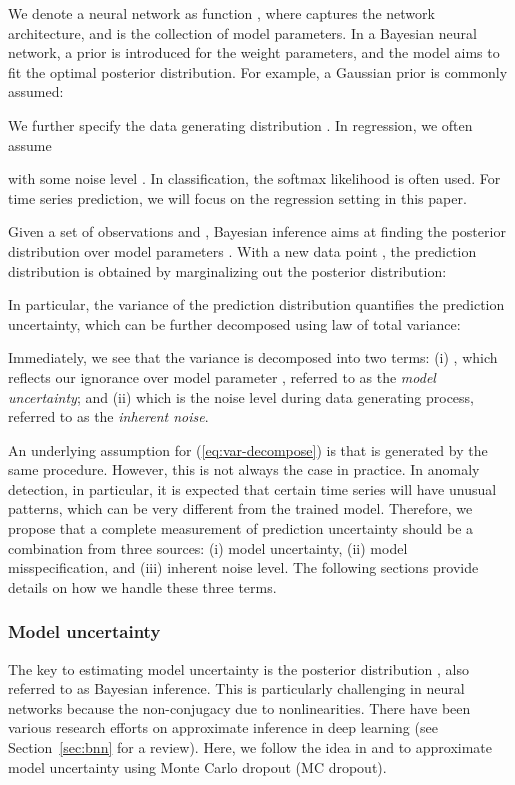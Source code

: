 \documentclass[conference,compsoc,final]{IEEEtran}
\begin{document}
We denote a neural network as function , where  captures the network architecture, and  is the collection of model parameters. 
In a Bayesian neural network, a prior is introduced for the weight parameters, and the model aims to fit the optimal posterior distribution. For example, a Gaussian prior is commonly assumed:

We further specify the data generating distribution . In regression, we often assume

with some noise level . In classification, the softmax likelihood is often used. For time series prediction, we will focus on the regression setting in this paper.

Given a set of  observations  and , Bayesian inference aims at finding the posterior distribution over model parameters . With a new data point , the prediction distribution is obtained by marginalizing out the posterior distribution:

In particular, the variance of the prediction distribution quantifies the prediction uncertainty, which can be further decomposed using law of total variance:


Immediately, we see that the variance is decomposed into two terms: (i) , which reflects our ignorance over model parameter , referred to as the {\it model uncertainty}; and (ii)  which is the noise level during data generating process,  referred to as the {\it inherent noise}.

An underlying assumption for (\ref{eq:var-decompose}) is that  is generated by the same procedure. However, this is not always the case in practice. In anomaly detection, in particular, it is expected that certain time series will have unusual patterns, which can be very different from the trained model. Therefore, we propose that a complete measurement of prediction uncertainty should be a combination from three sources: (i) model uncertainty, (ii) model misspecification, and (iii) inherent noise level. 
The following sections provide details on how we handle these three terms.

\subsubsection{Model uncertainty}
The key to estimating model uncertainty is the posterior distribution , also referred to as Bayesian inference. This is particularly challenging in neural networks because the non-conjugacy due to nonlinearities. There have been various research efforts on approximate inference in deep learning (see Section~\ref{sec:bnn} for a review). Here, we follow the idea in  \cite{gal2016dropout} and \cite{Gal2015Theoretically} to approximate model uncertainty using Monte Carlo dropout (MC dropout). 
\end{document}
